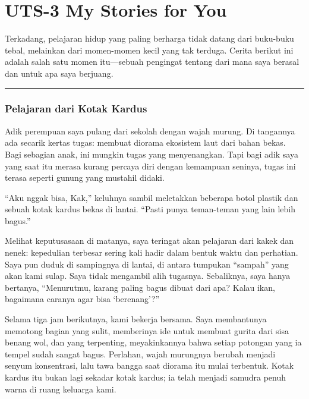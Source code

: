 \documentclass[
  letterpaper,
  DIV=11,
  numbers=noendperiod]{scrreprt}
\begin{document}

\chapter{UTS-3 My Stories for You}\label{uts-3-my-stories-for-you}

Terkadang, pelajaran hidup yang paling berharga tidak datang dari
buku-buku tebal, melainkan dari momen-momen kecil yang tak terduga.
Cerita berikut ini adalah salah satu momen itu---sebuah pengingat
tentang dari mana saya berasal dan untuk apa saya berjuang.

\begin{center}\rule{0.5\linewidth}{0.5pt}\end{center}

\subsection{Pelajaran dari Kotak
Kardus}\label{pelajaran-dari-kotak-kardus}

Adik perempuan saya pulang dari sekolah dengan wajah murung. Di
tangannya ada secarik kertas tugas: membuat diorama ekosistem laut dari
bahan bekas. Bagi sebagian anak, ini mungkin tugas yang menyenangkan.
Tapi bagi adik saya yang saat itu merasa kurang percaya diri dengan
kemampuan seninya, tugas ini terasa seperti gunung yang mustahil didaki.

``Aku nggak bisa, Kak,'' keluhnya sambil meletakkan beberapa botol
plastik dan sebuah kotak kardus bekas di lantai. ``Pasti punya
teman-teman yang lain lebih bagus.''

Melihat keputusasaan di matanya, saya teringat akan pelajaran dari kakek
dan nenek: kepedulian terbesar sering kali hadir dalam bentuk waktu dan
perhatian. Saya pun duduk di sampingnya di lantai, di antara tumpukan
``sampah'' yang akan kami sulap. Saya tidak mengambil alih tugasnya.
Sebaliknya, saya hanya bertanya, ``Menurutmu, karang paling bagus dibuat
dari apa? Kalau ikan, bagaimana caranya agar bisa `berenang'?''

Selama tiga jam berikutnya, kami bekerja bersama. Saya membantunya
memotong bagian yang sulit, memberinya ide untuk membuat gurita dari
sisa benang wol, dan yang terpenting, meyakinkannya bahwa setiap
potongan yang ia tempel sudah sangat bagus. Perlahan, wajah murungnya
berubah menjadi senyum konsentrasi, lalu tawa bangga saat diorama itu
mulai terbentuk. Kotak kardus itu bukan lagi sekadar kotak kardus; ia
telah menjadi samudra penuh warna di ruang keluarga kami.
\end{document}
